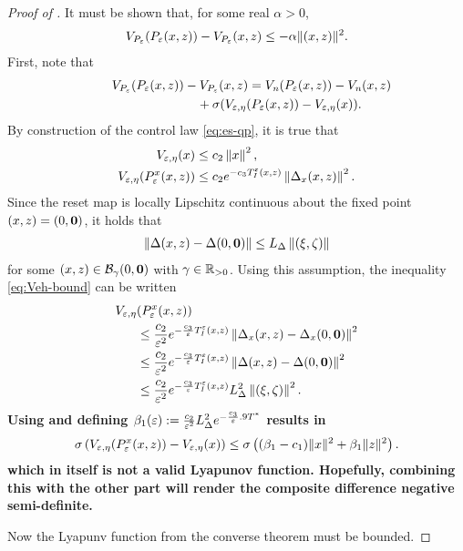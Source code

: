 \documentclass[twocolumn]{article}
\begin{document}
\begin{proof} [Proof of ]
  It must be shown that, for some real $\alpha > 0$,
  \begin{align}
    V_{P_{\varepsilon}}(P_{\varepsilon}(x, z)) - V_{P_{\varepsilon}}(x, z) \leq -\alpha \| (x, z) \|^{2}.
  \end{align}
  First, note that
  \begin{align}
    \nonumber
    \lefteqn{\VP(\Pe(\zdx, \zdz)) - \VP(\zdx, \zdz) = \Vn(\Pe(\zdx, \zdz)) - \Vn(\zdx, \zdz)}\\
    &&\hspace{2cm}\mbox{} + \sigma(\Vex(\Pe(\zdx, \zdz)) - \Vex(\zdx)).
  \end{align}
  By construction of the control law \eqref{eq:es-qp}, it is true that
  \begin{align}
    \label{eq:Veh-bound}
    V_{\varepsilon, \eta}(x) &\leq c_{2} \left\| x \right\|^{2},\\
    \nonumber
    V_{\varepsilon, \eta}(P_{\varepsilon}^{x}(x, z)) &\leq c_{2} e^{-c_{3} T_{I}^{\varepsilon}(x, z)} \left\| \Delta_{x}(x, z) \right\|^{2}.
  \end{align}
  Since the reset map is locally Lipschitz continuous about the fixed point $(x, z) = (0, {\mathbf 0})$, it holds that
  \begin{align}
    \left\| \Delta(x, z) - \Delta(0, {\mathbf 0}) \right\| \leq L_{\Delta} \left\| (\xi, \zeta) \right\|
  \end{align}
  for some $(x, z) \in {\mathcal B}_{\gamma}(0, {\mathbf 0})$ with $\gamma \in \mathbb{R}_{> 0}$.
  Using this assumption, the inequality \eqref{eq:Veh-bound} can be written
  \begin{align}
    V_{\varepsilon, \eta}&(P_{\varepsilon}^{x}(x, z))\\
    \nonumber
    &\leq \frac{c_{2}}{\varepsilon^{2}} e^{-\frac{c_{3}}{\varepsilon} T_{I}^{\varepsilon}(x, z)} \left\| \Delta_{x}(x, z) - \Delta_{x}(0, {\mathbf 0}) \right\|^{2}\\
    \nonumber
    &\leq \frac{c_{2}}{\varepsilon^{2}} e^{-\frac{c_{3}}{\varepsilon} T_{I}^{\varepsilon}(x, z)} \left\| \Delta(x, z) - \Delta(0, {\mathbf 0}) \right\|^{2}\\
    \nonumber
    &\leq \frac{c_{2}}{\varepsilon^{2}} e^{-\frac{c_{3}}{\varepsilon} T_{I}^{\varepsilon}(x, z)} L_{\Delta}^{2} \left\| (\xi, \zeta) \right\|^{2}.
  \end{align}
  {\bf Using  and defining $\beta_{1}(\varepsilon) := \frac{c_{2}}{\varepsilon^{2}} L_{\Delta}^{2} e^{-\frac{c_{3}}{\varepsilon} .9 T^{*}}$ results in
  \begin{align}
    \sigma \left( V_{\varepsilon, \eta}(P_{\varepsilon}^{x}(x, z)) - V_{\varepsilon, \eta}(x) \right) \leq \sigma \left( (\beta_{1} - c_{1}) \| x \|^{2} + \beta_{1} \| z \|^{2} \right).
  \end{align}
  which in itself is not a valid Lyapunov function.
  Hopefully, combining this with the other part will render the composite difference negative semi-definite.}

  Now the Lyapunv function from the converse theorem must be bounded.
\end{proof}
\end{document}
